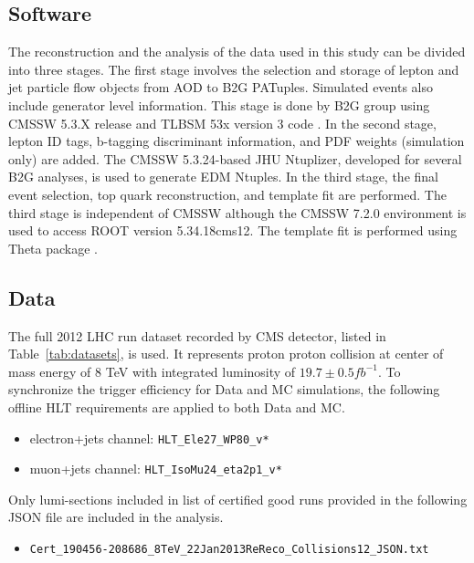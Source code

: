 \documentclass{cmspaperpdf}
\begin{document}
\subsection{Software}
The reconstruction and the analysis of the data used in this study can be divided into three stages.  The first stage involves the selection and storage of lepton and jet particle flow objects from AOD to B2G PATuples.  Simulated events also include generator level information.  This stage is done by B2G group using CMSSW 5.3.X release and TLBSM 53x version 3 code \cite{B2G_twiki}.  In the second stage, lepton ID tags, b-tagging discriminant information, and PDF weights (simulation only) are added.  The  CMSSW 5.3.24-based JHU Ntuplizer, developed for several B2G analyses, is used to generate EDM Ntuples.  In the third stage, the final event selection, top quark reconstruction, and template fit are performed. The third stage is independent of CMSSW although the CMSSW 7.2.0 environment is used to access ROOT version 5.34.18cms12. The template fit is performed using Theta package \cite{muller2010theta}.
  
\subsection{Data}
The full 2012 LHC run dataset recorded by CMS detector, listed in Table~\ref{tab:datasets}, is used.  It represents proton proton collision at center of mass energy of 8 TeV with integrated luminosity of $19.7 \pm 0.5 fb^{-1}$.  
To synchronize the trigger efficiency for Data and MC simulations, the following offline HLT requirements are applied to both Data and MC.
\begin{itemize}
\item electron+jets channel: \texttt{HLT\_Ele27\_WP80\_v*}
\item muon+jets channel: \texttt{HLT\_IsoMu24\_eta2p1\_v*}
\end{itemize}
Only lumi-sections included in list of certified good runs provided in the following JSON file are included in the analysis. 
\begin{itemize}
\item \texttt{Cert\_190456-208686\_8TeV\_22Jan2013ReReco\_Collisions12\_JSON.txt}
\end{itemize}
\end{document}
